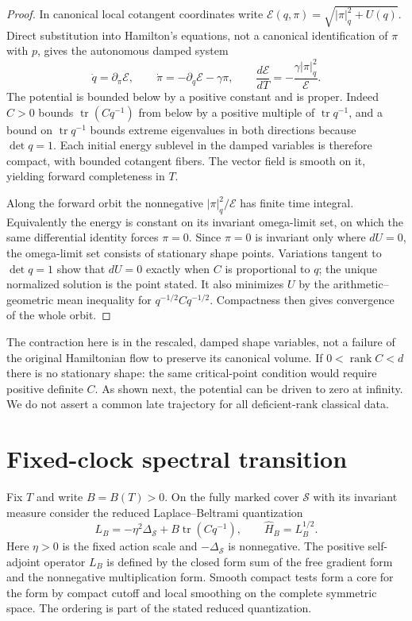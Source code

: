 \documentclass[10pt]{article}
\newcommand{\tr}{\operatorname{tr}}
\begin{document}
\begin{proof}
In canonical local cotangent coordinates write $\mathcal E(q,\pi)=\sqrt{|\pi|_q^2+U(q)}$. Direct substitution into Hamilton's equations, not a canonical identification of $\pi$ with $p$, gives the autonomous damped system
\[
 \dot q=\partial_\pi\mathcal E, \qquad
 \dot\pi=-\partial_q\mathcal E-\gamma\pi,\qquad
 \frac{d\mathcal E}{dT}=-\frac{\gamma|\pi|_q^2}{\mathcal E}.
\]
The potential is bounded below by a positive constant and is proper. Indeed $C>0$ bounds $\tr(Cq^{-1})$ from below by a positive multiple of $\tr q^{-1}$, and a bound on $\tr q^{-1}$ bounds extreme eigenvalues in both directions because $\det q=1$. Each initial energy sublevel in the damped variables is therefore compact, with bounded cotangent fibers. The vector field is smooth on it, yielding forward completeness in $T$.

Along the forward orbit the nonnegative $|\pi|_q^2/\mathcal E$ has finite time integral. Equivalently the energy is constant on its invariant omega-limit set, on which the same differential identity forces $\pi=0$. Since $\pi=0$ is invariant only where $dU=0$, the omega-limit set consists of stationary shape points. Variations tangent to $\det q=1$ show that $dU=0$ exactly when $C$ is proportional to $q$; the unique normalized solution is the point stated. It also minimizes $U$ by the arithmetic--geometric mean inequality for $q^{-1/2}Cq^{-1/2}$. Compactness then gives convergence of the whole orbit.
\end{proof}

The contraction here is in the rescaled, damped shape variables, not a failure of the original Hamiltonian flow to preserve its canonical volume. If $0<\operatorname{rank} C<d$ there is no stationary shape: the same critical-point condition would require positive definite $C$. As shown next, the potential can be driven to zero at infinity. We do not assert a common late trajectory for all deficient-rank classical data.

\section{Fixed-clock spectral transition}

Fix $T$ and write $B=B(T)>0$. On the fully marked cover $\mathcal S$ with its invariant measure consider the reduced Laplace--Beltrami quantization
\[
 L_B=-\eta^2\Delta_{\mathcal S}+B\tr(Cq^{-1}),\qquad
 \widehat H_B=L_B^{1/2}.
\]
Here $\eta>0$ is the fixed action scale and $-\Delta_{\mathcal S}$ is nonnegative. The positive self-adjoint operator $L_B$ is defined by the closed form sum of the free gradient form and the nonnegative multiplication form. Smooth compact tests form a core for the form by compact cutoff and local smoothing on the complete symmetric space. The ordering is part of the stated reduced quantization.
\end{document}
